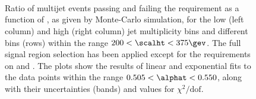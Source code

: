 \begin{figure}[!h]
  \centering
   \\
   \\
   \\
  \caption{Ratio of multijet events passing and failing the \mhtmet
    requirement as a function of \alphat, as given by Monte-Carlo
    simulation, for the low (left column) and high (right column) jet
    multiplicity bins and different \scalht bins (rows) within the
    range $200 < \scalht < 375\gev$. The full signal region selection
    has been applied except for the requirements on \mhtmet and
    \alphat. The plots show the results of linear and exponential fits
    to the data points within the range $0.505 < \alphat < 0.550$,
    along with their uncertainties (bands) and values for $\chi^2 /
    \textrm{dof}$.}
  \label{fig:}
\end{figure}

